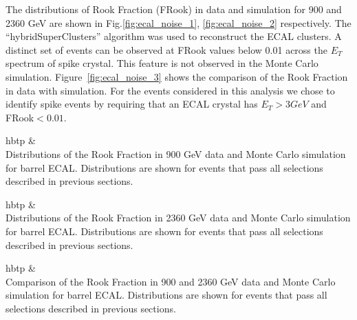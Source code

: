 The distributions of Rook Fraction (FRook) in data and simulation for
900 and 2360 GeV are shown in Fig.\ref{fig:ecal_noise_1},
\ref{fig:ecal_noise_2} respectively. The ``hybridSuperClusters''
algorithm was used to reconstruct the ECAL clusters. A distinct set of events can
be observed at FRook values below 0.01 across the $E_T$ spectrum of
spike crystal. This feature is not observed in the Monte Carlo
simulation. Figure~\ref{fig:ecal_noise_3} shows the comparison of the
Rook Fraction in data with simulation. For the events considered in this
analysis we chose to identify spike events by requiring that an ECAL
crystal has $E_T>3GeV$ and FRook$<0.01$.

\begin{2figures}{hbtp}
   &
   \\
\caption{Distributions of the Rook Fraction in 900 GeV data and Monte Carlo
  simulation for barrel ECAL. Distributions are shown for events that pass all
  selections described in previous sections.}
\label{fig:ecal_noise_1}
\end{2figures}

\begin{2figures}{hbtp}
   &
   \\
\caption{Distributions of the Rook Fraction in 2360 GeV data and Monte Carlo
  simulation for barrel ECAL. Distributions are shown for events that pass all
  selections described in previous sections.}
\label{fig:ecal_noise_2}
\end{2figures}

\begin{2figures}{hbtp}
 &
  \\
  \caption{Comparison of the Rook Fraction in 900 and 2360 GeV data and Monte Carlo
  simulation for barrel ECAL. Distributions are shown for events that pass all
  selections described in previous sections.}
\label{fig:ecal_noise_3}
\end{2figures}

